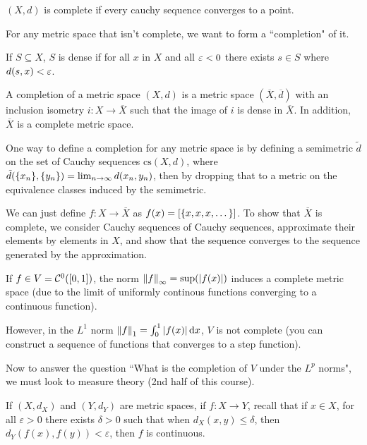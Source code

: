 \begin{definition}[Completeness]
    $(X, d)$ is complete if every cauchy sequence converges to a point.
\end{definition}

For any metric space that isn't complete, we want to form a ``completion" of it.

\begin{definition}[Density]
   If $S \subseteq X$, $S$ is dense if for all $x$ in $X$ and all $\varepsilon < 0$ there exists $s \in S$ where $d(s, x) < \varepsilon$.
\end{definition}

\begin{definition}[Completion]
    A completion of a metric space $(X, d)$ is a metric space $(\overline X, \overline d)$ with an inclusion isometry $i \colon X \to \overline{X}$ such that the image of $i$ is dense in $\overline{X}$. In addition, $\overline{X}$ is a complete metric space.
\end{definition}

One way to define a completion for any metric space is by defining a semimetric $\tilde d$ on the set of Cauchy sequences $\mathrm{cs}(X, d)$, where $\tilde d\qty(\qty{x_n}, \qty{y_n}) = \lim_{n \to \infty} d(x_n, y_n)$, then by dropping that to a metric on the equivalence classes induced by the semimetric.

We can just define $f \colon X \to \overline X$ as $f(x) = [\qty{x, x, x, \dots}]$. To show that $\overline X$ is complete, we consider Cauchy sequences of Cauchy sequences, approximate their elements by elements in $X$, and show that the sequence converges to the sequence generated by the approximation.

\begin{example}
    If $f \in V = \mathcal C^0([0, 1])$, the norm $\norm{f}_\infty = \sup(\abs{f(x)})$ induces a complete metric space (due to the limit of uniformly continous functions converging to a continuous function).

    However, in the $L^1$ norm $\norm{f}_1 = \int_0^1 \abs{f(x)} \dd{x}$, $V$ is not complete (you can construct a sequence of functions that converges to a step function).
\end{example}

Now to answer the question ``What is the completion of $V$ under the $L^p$ norms", we must look to measure theory (2nd half of this course).

If $(X, d_X)$ and $(Y, d_Y)$ are metric spaces, if $f \colon X \to Y$, recall that if $x \in X$, for all $\varepsilon > 0$ there exists $\delta > 0$ such that when $d_X(x, y) \le \delta$, then $d_Y(f(x), f(y)) < \varepsilon$, then $f$ is continuous.

